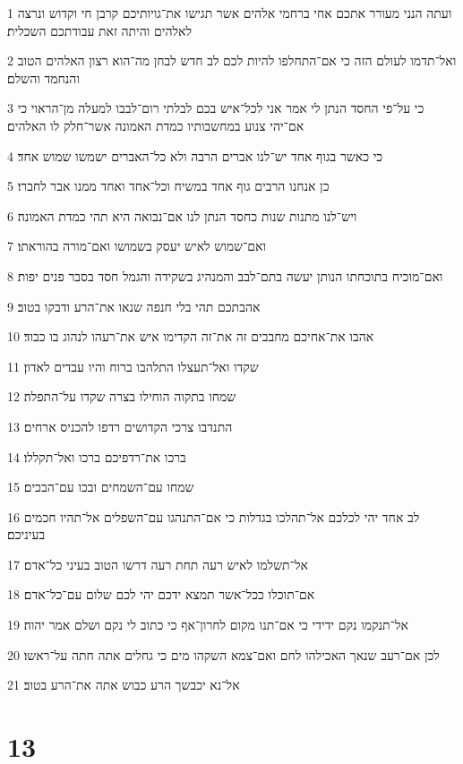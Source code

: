 \par 1 ועתה הנני מעורר אתכם אחי ברחמי אלהים אשר תגישו את־גויותיכם קרבן חי וקדוש ונרצה לאלהים והיתה זאת עבודתכם השכלית׃
\par 2 ואל־תדמו לעולם הזה כי אם־התחלפו להיות לכם לב חדש לבחן מה־הוא רצון האלהים הטוב והנחמד והשלם׃
\par 3 כי על־פי החסד הנתן לי אמר אני לכל־איש בכם לבלתי רום־לבבו למעלה מן־הראוי כי אם־יהי צנוע במחשבותיו כמדת האמונה אשר־חלק לו האלהים׃
\par 4 כי כאשר בגוף אחד יש־לנו אברים הרבה ולא כל־האברים ישמשו שמוש אחד׃
\par 5 כן אנחנו הרבים גוף אחד במשיח וכל־אחד ואחד ממנו אבר לחברו׃
\par 6 ויש־לנו מתנות שנות כחסד הנתן לנו אם־נבואה היא תהי כמדת האמונה׃
\par 7 ואם־שמוש לאיש יעסק בשמושו ואם־מורה בהוראתו׃
\par 8 ואם־מוכיח בתוכחתו הנותן יעשה בתם־לבב והמנהיג בשקידה והגמל חסד בסבר פנים יפות׃
\par 9 אהבתכם תהי בלי חנפה שנאו את־הרע ודבקו בטוב׃
\par 10 אהבו את־אחיכם מחבבים זה את־זה הקדימו איש את־רעהו לנהוג בו כבוד׃
\par 11 שקדו ואל־תעצלו התלהבו ברוח והיו עבדים לאדון׃
\par 12 שמחו בתקוה הוחילו בצרה שקדו על־התפלה׃
\par 13 התנדבו צרכי הקדושים רדפו להכניס ארחים׃
\par 14 ברכו את־רדפיכם ברכו ואל־תקללו׃
\par 15 שמחו עם־השמחים ובכו עם־הבכים׃
\par 16 לב אחד יהי לכלכם אל־תהלכו בגדלות כי אם־התנהגו עם־השפלים אל־תהיו חכמים בעיניכם׃
\par 17 אל־תשלמו לאיש רעה תחת רעה דרשו הטוב בעיני כל־אדם׃
\par 18 אם־תוכלו ככל־אשר תמצא ידכם יהי לכם שלום עם־כל־אדם׃
\par 19 אל־תנקמו נקם ידידי כי אם־תנו מקום לחרון־אף כי כתוב לי נקם ושלם אמר יהוה׃
\par 20 לכן אם־רעב שנאך האכילהו לחם ואם־צמא השקהו מים כי גחלים אתה חתה על־ראשו׃
\par 21 אל־נא יכבשך הרע כבוש אתה את־הרע בטוב׃

\chapter{13}

